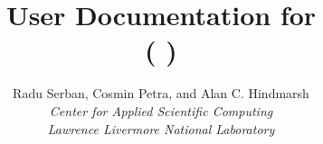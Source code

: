 \documentclass[twoside,openright,10pt]{report}
\title{User Documentation for {\idas} {\idasrelease} \\
           ({\sundials} {\sunrelease})}
\author{
  Radu Serban, Cosmin Petra, and Alan C. Hindmarsh\\
  {\em Center for Applied Scientific Computing} \\
  {\em Lawrence Livermore National Laboratory}
}
\date{
  \today 
  \vfill 
  {\centerline{\texttt{[image: doc\_logo\_blue]}}}
  \vfill \idaucrlug
}
\begin{document}
\frontug
\renewcommand{\chaptermark}[1]{\markboth{#1}{}}
\renewcommand{\sectionmark}[1]{\markright{\thesection\ #1}}


\clearemptydoublepage

\clearemptydoublepage

\clearemptydoublepage

\clearemptydoublepage

\clearemptydoublepage

\clearemptydoublepage

\clearemptydoublepage

\clearemptydoublepage

\clearemptydoublepage

\clearemptydoublepage
\appendix

\clearemptydoublepage

\clearemptydoublepage


\clearemptydoublepage
\printindex
\clearemptydoublepage
\end{document}
